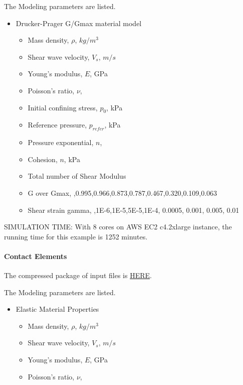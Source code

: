 The Modeling parameters are listed.
\begin{itemize}
  \item Drucker-Prager G/Gmax material model 
  \begin{itemize}
    \item Mass density, $\rho$, \enspace {} $kg/m^3$
    \item Shear wave velocity, $V_s$, \enspace {} $m/s$
    \item Young's modulus, $E$, \enspace {} GPa
    \item Poisson's ratio, $\nu$, \enspace {}
    \item Initial confining stress, $p_0$, \enspace {} kPa
    \item Reference pressure, $p_{refer} $, \enspace {} kPa
    \item Pressure exponential, $ n  $, \enspace {}
    \item Cohesion, $ n  $, \enspace {} kPa
    \item Total number of Shear Modulus \enspace {}
    \item G over Gmax, \enspace {},0.995,0.966,0.873,0.787,0.467,0.320,0.109,0.063
    \item Shear strain gamma, \enspace {},1E-6,1E-5,5E-5,1E-4, 0.0005, 0.001, 0.005, 0.01
  \end{itemize}
\end{itemize}

SIMULATION TIME: With 8 cores on AWS EC2 c4.2xlarge instance, the running time for this example is 1252 minutes.


\paragraph{Contact Elements}
The compressed package of input files is  
\href{http://sokocalo.engr.ucdavis.edu/~jeremic/Real_ESSI_Simulator/Real_ESSI_Short_Course_Examples_Dec2017/short-course-examples/nonlinear_analysis_steps/soil-foundation/contact/_all_files_packaged_for_contact.tar.gz}{HERE}. 


The Modeling parameters are listed.
\begin{itemize}
  \item Elastic Material Properties 
  \begin{itemize}
    \item Mass density, $\rho$, \enspace {} $kg/m^3$
    \item Shear wave velocity, $V_s$, \enspace {} $m/s$
    \item Young's modulus, $E$, \enspace {} GPa
    \item Poisson's ratio, $\nu$, \enspace {}
  \end{itemize}
\end{itemize}

